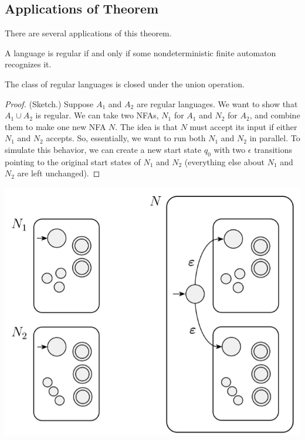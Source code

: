 \documentclass[letterpaper]{article}
\begin{document}
\subsection{Applications of Theorem}
There are several applications of this theorem. 

\begin{corollary}{}{}
    A language is regular if and only if some nondeterministic finite automaton recognizes it.
\end{corollary}


\begin{theorem}{}{}
    The class of regular languages is closed under the union operation.
\end{theorem}

\begin{mdframed}[]
    \begin{proof}
        (Sketch.) Suppose $A_1$ and $A_2$ are regular languages. We want to show that $A_1 \cup A_2$ is regular. We can take two NFAs, $N_1$ for $A_1$ and $N_2$ for $A_2$, and combine them to make one new NFA $N$. The idea is that $N$ must accept its input if either $N_1$ and $N_2$ accepts. So, essentially, we want to run both $N_1$ and $N_2$ in parallel. To simulate this behavior, we can create a new start state $q_0$ with two $\epsilon$ transitions pointing to the original start states of $N_1$ and $N_2$ (everything else about $N_1$ and $N_2$ are left unchanged).    
    \end{proof}
\end{mdframed}

\begin{center}
    \includegraphics[scale=0.5]{../assets/union_nfa.png}
\end{center}
\end{document}
